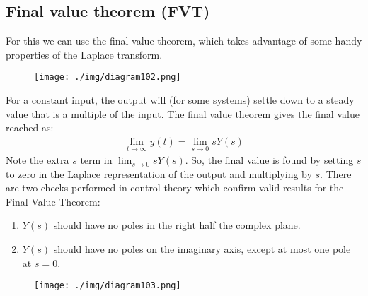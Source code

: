 \subsection{Final value theorem (FVT)}
For this we can use the final value theorem, which takes advantage of some handy properties of the Laplace transform.
\begin{figure}[H]
  \centerline{\texttt{[image: ./img/diagram102.png]}}
  \caption{}
\end{figure}
For a constant input, the output will (for some systems) settle down to a steady value that is a multiple of the input. The final value theorem gives the final value reached as:
\begin{align}
  \lim_{t\rightarrow \infty} y(t) = \lim_{s\rightarrow 0} s Y(s)
\end{align}
Note the extra $s$ term in $\lim_{s\rightarrow 0} s Y(s)$. So, the final value is found by setting $s$ to zero in the Laplace representation of the output and multiplying by $s$. There are two checks performed in control theory which confirm valid results for the Final Value Theorem:
\begin{enumerate}
  \item $Y(s)$ should have no poles in the right half the complex plane.
  \item $Y(s)$ should have no poles on the imaginary axis, except at most one pole at $s=0$.
\end{enumerate}
\begin{figure}[H]
  \centerline{\texttt{[image: ./img/diagram103.png]}}
  \caption{}
\end{figure}
